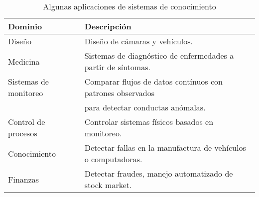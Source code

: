 \begin{table}[]
\label{table:kb_apps}
\begin{tabular}{@{}ll@{}}
\toprule
\textbf{Dominio}    & \textbf{Descripci\'on}  \\ \midrule
Dise\~no           & Dise\~no de c\'amaras y veh\'iculos.  \\
Medicina          & Sistemas de diagn\'ostico de enfermedades a partir de s\'intomas.       \\
Sistemas de monitoreo      & Comparar flujos de datos cont\'inuos con patrones observados\\ & para detectar conductas an\'omalas.\\
Control de procesos & Controlar sistemas f\'isicos basados en monitoreo.\\
Conocimiento        & Detectar fallas en la manufactura de veh\'iculos o computadoras.\\
Finanzas        & Detectar fraudes, manejo automatizado de stock market.\\ \bottomrule
\end{tabular}
\caption{Algunas aplicaciones de sistemas de conocimiento}
\end{table}








